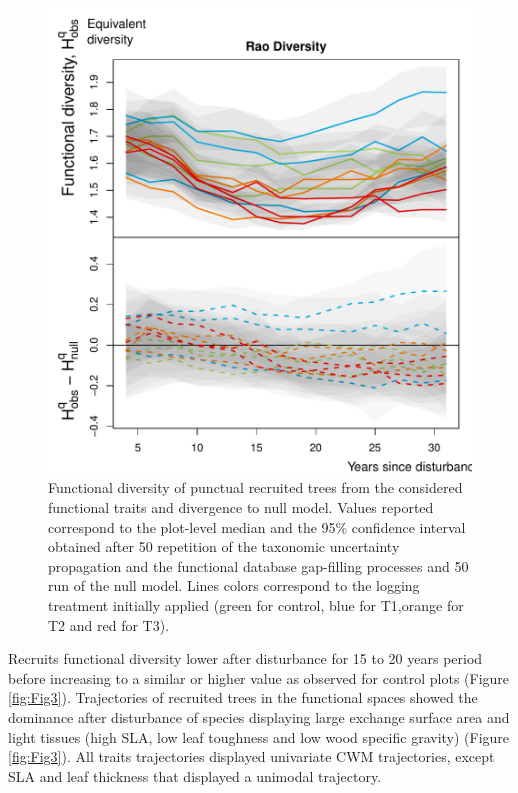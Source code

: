 \documentclass[fleqn,10pt]{ArtEcoFoG} %
\begin{document}
\begin{figure}

{\centering \includegraphics{RecruitmentTrajectories_files/figure-latex/Fig2-1} 

}

\caption{Functional diversity of punctual recruited trees from the considered functional traits and divergence to null model. Values reported correspond to the plot-level median and the 95\% confidence interval obtained after 50 repetition of the taxonomic uncertainty propagation and the functional database gap-filling processes and 50 run of the null model. Lines colors correspond to the logging treatment initially applied (green for control, blue for T1,orange for T2 and red for T3).}\label{fig:Fig2}
\end{figure}

Recruits functional diversity lower after disturbance for 15 to 20 years
period before increasing to a similar or higher value as observed for
control plots (Figure \ref{fig:Fig3}). Trajectories of recruited trees
in the functional spaces showed the dominance after disturbance of
species displaying large exchange surface area and light tissues (high
SLA, low leaf toughness and low wood specific gravity) (Figure
\ref{fig:Fig3}). All traits trajectories displayed univariate CWM
trajectories, except SLA and leaf thickness that displayed a unimodal
trajectory.
\end{document}

